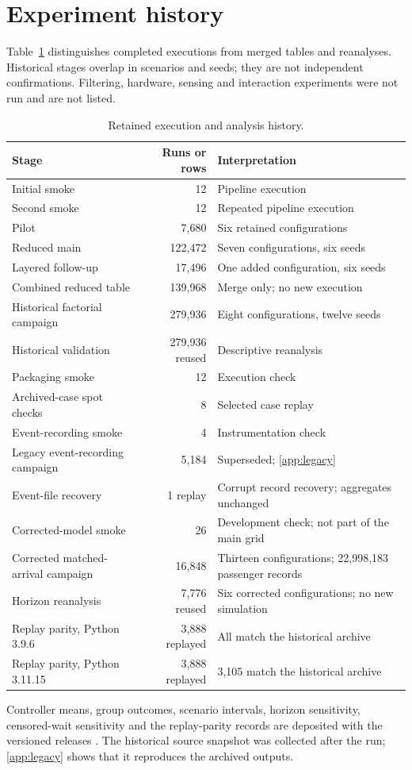 \section{Experiment history}\label{app:history}
\setcounter{table}{0}
Table~\ref{tab:history} distinguishes completed executions from merged tables and reanalyses. Historical stages overlap in scenarios and seeds; they are not independent confirmations. Filtering, hardware, sensing and interaction experiments were not run and are not listed.
\begin{table}[H]\centering
\caption{Retained execution and analysis history.}\label{tab:history}
\small\begin{tabular}{@{}p{.36\linewidth}rp{.42\linewidth}@{}}
\toprule Stage & Runs or rows & Interpretation\\\midrule
Initial smoke & 12 & Pipeline execution\\
Second smoke & 12 & Repeated pipeline execution\\
Pilot & 7,680 & Six retained configurations\\
Reduced main & 122,472 & Seven configurations, six seeds\\
Layered follow-up & 17,496 & One added configuration, six seeds\\
Combined reduced table & 139,968 & Merge only; no new execution\\
Historical factorial campaign & 279,936 & Eight configurations, twelve seeds\\
Historical validation & 279,936 reused & Descriptive reanalysis\\
Packaging smoke & 12 & Execution check\\
Archived-case spot checks & 8 & Selected case replay\\
Event-recording smoke & 4 & Instrumentation check\\
Legacy event-recording campaign & 5,184 & Superseded; \ref{app:legacy}\\
Event-file recovery & 1 replay & Corrupt record recovery; aggregates unchanged\\
Corrected-model smoke & 26 & Development check; not part of the main grid\\
Corrected matched-arrival campaign & 16,848 & Thirteen configurations; 22,998,183 passenger records\\
Horizon reanalysis & 7,776 reused & Six corrected configurations; no new simulation\\
Replay parity, Python 3.9.6 & 3,888 replayed & All match the historical archive\\
Replay parity, Python 3.11.15 & 3,888 replayed & 3,105 match the historical archive\\
\bottomrule
\end{tabular}
\end{table}
Controller means, group outcomes, scenario intervals, horizon sensitivity, censored-wait sensitivity and the replay-parity records are deposited with the versioned releases \cite{dataset}. The historical source snapshot was collected after the run; \ref{app:legacy} shows that it reproduces the archived outputs.

